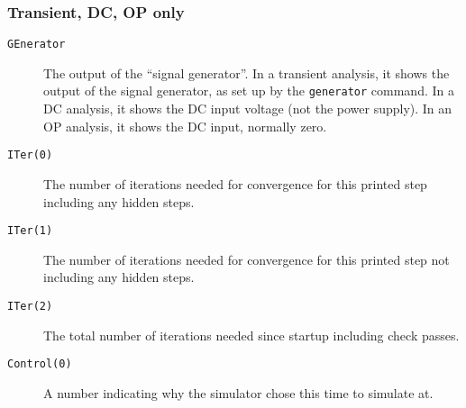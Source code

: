 \subsubsection{Transient, DC, OP only}
\begin{description}

\item[{\tt GEnerator}] The output of the ``signal generator''.  In a 
transient analysis, it shows the output of the signal generator, as set 
up by the {\tt generator} command.  In a DC analysis, it shows the DC
input voltage (not the power supply).  In an OP analysis, it shows the
DC input, normally zero.  

\item[{\tt ITer(0)}] The number of iterations needed for convergence for
this printed step including any hidden steps.

\item[{\tt ITer(1)}] The number of iterations needed for convergence for
this printed step not including any hidden steps.

\item[{\tt ITer(2)}] The total number of iterations needed since startup
including check passes.

\item[{\tt Control(0)}] A number indicating why the simulator chose this
time to simulate at.
\end{description}
